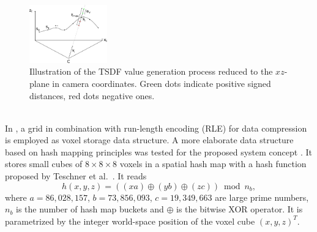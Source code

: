 \documentclass[conference]{IEEEtran}
\begin{document}
\begin{figure}[!htbp]
	\centering
	\includegraphics[width=0.30\textwidth]{figures/fusion1}
	\caption{
		Illustration of the TSDF value generation process reduced to the $xz$-plane in camera coordinates.
		Green dots indicate positive signed distances, red dots negative ones.     
	}
	\label{fig:tsdfcreation}
\end{figure}
\\
In \cite{Curless1996}, a grid in combination with run-length encoding (RLE) for data compression is employed as voxel storage data structure. 
A more elaborate data structure based on hash mapping principles was tested for the proposed system concept \cite{Niessner2013}. 
It stores small cubes of $8\times8\times8$ voxels in a spatial hash map with a hash function proposed by Teschner et al.\ \cite{Teschner2003}.
It reads 
$$h(x,y,z) = ((x a)\oplus(y b)\oplus(z c))\bmod n_b,$$
where $a = 86{,}028{,}157$, $b = 73{,}856{,}093$, $c = 19{,}349{,}663$ are large prime numbers, $n_b$ is the number of hash map buckets and $\oplus$ is the bitwise XOR operator. 
It is parametrized by the integer world-space position of the voxel cube $(x,y,z)^T$.
\end{document}
